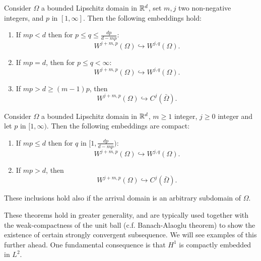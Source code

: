 \begin{theorem}
Consider $\Omega$ a bounded Lipschitz domain in $\mathbb{R}^d$, set $m,j$ two non-negative integers, and $p$ in $[1,\infty]$. Then the following embeddings hold: 
\begin{enumerate}
    \item If $mp < d$ then for $p \leq q \leq \frac{dp}{d-mp}$:
        \begin{equation}
            W^{j+m, p}(\Omega) \hookrightarrow W^{j,q}(\Omega).
        \end{equation}
    \item If $mp = d$, then for $p \leq q < \infty$:
        \begin{equation}
            W^{j+m, p}(\Omega) \hookrightarrow W^{j,q}(\Omega).
        \end{equation}
    \item If $mp > d \geq (m-1)p$, then 
        \begin{equation}
            W^{j+m,p}(\Omega) \hookrightarrow C^j(\bar\Omega).
        \end{equation}
    \end{enumerate}
\end{theorem}

\begin{theorem}
Consider $\Omega$ a bounded Lipschitz domain in $\mathbb{R}^d$, $m\geq 1$ integer, $j\geq 0$ integer and let $p$ in $[1,\infty)$. Then the following embeddings are compact:
\begin{enumerate}
    \item If $mp \leq d$  then for $q$ in $[1, \frac{dp}{d - mp})$:
        \begin{equation}
            W^{j+m, p}(\Omega) \hookrightarrow W^{j,q}(\Omega).
        \end{equation}
    \item If $mp > d$, then 
        \begin{equation}
            W^{j+m, p}(\Omega) \hookrightarrow C^j(\bar\Omega).
        \end{equation}
\end{enumerate}
These inclusions hold also if the arrival domain is an arbitrary subdomain of $\Omega$. 
\end{theorem}
These theorems hold in greater generality, and are typically used together with the weak-compactness of the unit ball (c.f. Banach-Alaoglu theorem) to show the existence of certain strongly convergent subsequence. We will see examples of this further ahead. One fundamental consequence is that $H^1$ is compactly embedded in $L^2$.


